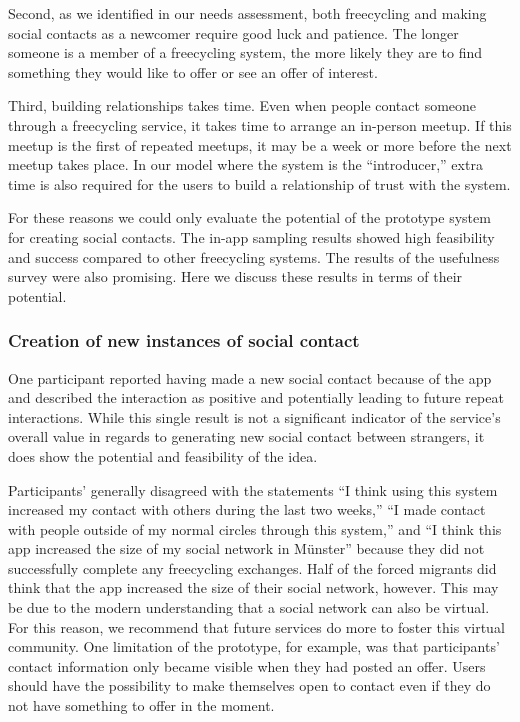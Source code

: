 Second, as we identified in our needs assessment, both freecycling and making social contacts as a newcomer require good luck and patience. The longer someone is a member of a freecycling system, the more likely they are to find something they would like to offer or see an offer of interest.

Third, building relationships takes time. Even when people contact someone through a freecycling service, it takes time to arrange an in-person meetup. If this meetup is the first of repeated meetups, it may be a week or more before the next meetup takes place. In our model where the system is the ``introducer,'' extra time is also required for the users to build a relationship of trust with the system.

For these reasons we could only evaluate the potential of the prototype system for creating social contacts. The in-app sampling results showed high feasibility and success compared to other freecycling systems. The results of the usefulness survey were also promising. Here we discuss these results in terms of their potential.



\subsubsection*{Creation of new instances of social contact}

One participant reported having made a new social contact because of the app and described the interaction as positive and potentially leading to future repeat interactions. While this single result is not a significant indicator of the service's overall value in regards to generating new social contact between strangers, it does show the potential and feasibility of the idea.

Participants' generally disagreed with the statements ``I think using this system increased my contact with others during the last two weeks,'' ``I made contact with people outside of my normal circles through this system,'' and ``I think this app increased the size of my social network in Münster'' because they did not successfully complete any freecycling exchanges. Half of the forced migrants did think that the app increased the size of their social network, however. This may be due to the modern understanding that a social network can also be virtual. For this reason, we recommend that future services do more to foster this virtual community. One limitation of the prototype, for example, was that participants' contact information only became visible when they had posted an offer. Users should have the possibility to make themselves open to contact even if they do not have something to offer in the moment.

